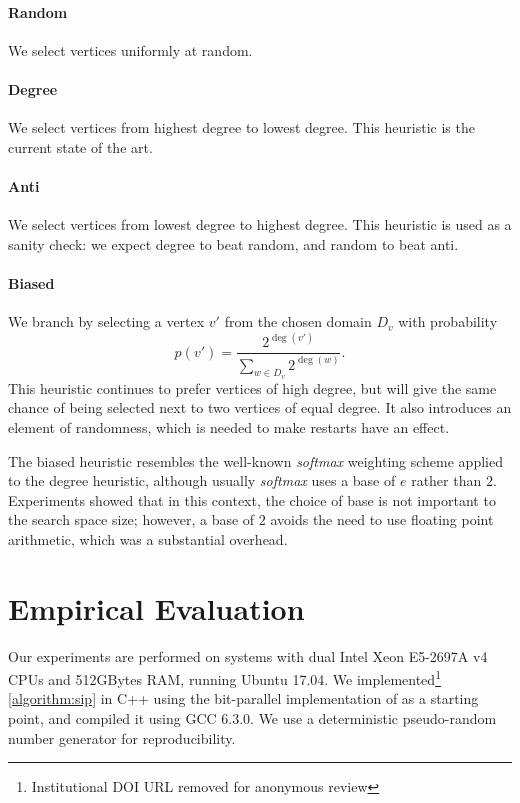 \documentclass{article}
\newcommand{\citet}[1]{\citeauthor{#1} \shortcite{#1}}
\begin{document}
\paragraph{Random} We select vertices uniformly at random.

\paragraph{Degree} We select vertices from highest degree to lowest degree. This heuristic is the
current state of the art.

\paragraph{Anti} We select vertices from lowest degree to highest degree. This heuristic is used as
a sanity check: we expect degree to beat random, and random to beat anti.

\paragraph{Biased} We branch by selecting a vertex $v'$ from the chosen domain $D_v$ with
probability \[ p(v') = \frac{2^{\deg(v')}}{\sum_{w \in D_v}{2^{\deg(w)}}} \text{.} \] This heuristic
continues to prefer vertices of high degree, but will give the same chance of being selected next to
two vertices of equal degree.  It also introduces an element of randomness, which is needed to make
restarts have an effect.

The biased heuristic resembles the well-known \emph{softmax} weighting scheme applied to the degree
heuristic, although usually \emph{softmax} uses a base of $e$ rather than $2$.  Experiments showed
that in this context, the choice of base is not important to the search space size; however, a base
of $2$ avoids the need to use floating point arithmetic, which was a substantial overhead.

\section{Empirical Evaluation}

Our experiments are performed on systems with dual Intel Xeon E5-2697A v4 CPUs and 512GBytes RAM,
running Ubuntu 17.04. We implemented\footnote{Institutional DOI URL removed for anonymous review}
\cref{algorithm:sip} in C++ using the bit-parallel implementation of
\citet{DBLP:conf/aaai/HoffmannMR17} as a starting point, and compiled it using GCC 6.3.0. We use a
deterministic pseudo-random number generator for reproducibility.
\end{document}
